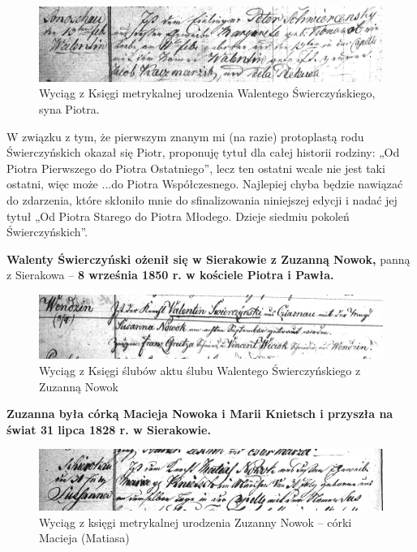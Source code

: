 \begin{figure}[!h]
\begin{center}
\includegraphics[width=\textwidth]{photo/ksiega_metrykalna_1.jpg}
\caption{Wyciąg z Księgi metrykalnej urodzenia Walentego Świerczyńskiego, syna Piotra.}
\end{center}
\end{figure}

W związku z tym, że pierwszym znanym mi (na razie)  protoplastą rodu Świerczyńskich okazał się Piotr, proponuję tytuł dla całej historii rodziny: „Od Piotra Pierwszego do Piotra Ostatniego”, lecz ten ostatni wcale nie jest taki ostatni, więc może ...do Piotra Współczesnego. Najlepiej  chyba będzie nawiązać do zdarzenia, które skłoniło mnie do sfinalizowania niniejszej edycji i nadać jej tytuł „Od Piotra Starego do Piotra Młodego. Dzieje siedmiu pokoleń Świerczyńskich”. 

\textbf{Walenty Świerczyński ożenił się  w Sierakowie z Zuzanną Nowok,} panną z Sierakowa – \textbf{8 września 1850 r. w kościele Piotra i Pawła.}
\begin{figure}[!h]
\begin{center}
\includegraphics[width=\textwidth]{photo/ksiega_metrykalna_2.jpg}
\caption{Wyciąg z Księgi ślubów aktu ślubu Walentego Świerczyńskiego z Zuzanną Nowok}
\end{center}
\end{figure}

\textbf{Zuzanna była córką Macieja Nowoka i Marii Knietsch i przyszła na świat 31 lipca 1828 r. w Sierakowie.}
\begin{figure}[!h]
\begin{center}
\includegraphics[width=\textwidth]{photo/ksiega_metrykalna_3.jpg}
\caption{Wyciąg z księgi metrykalnej urodzenia Zuzanny Nowok -- córki Macieja (Matiasa)}
\end{center}
\end{figure}


